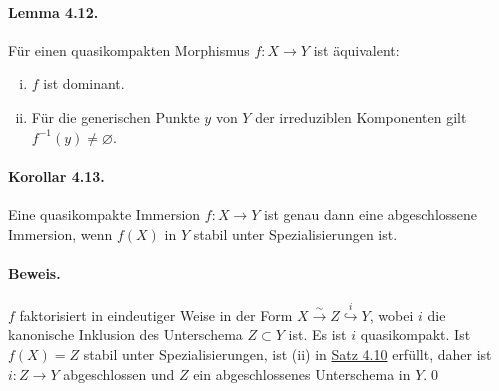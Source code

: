 \paragraph{Lemma 4.12.}\label{4.12} Für einen quasikompakten Morphismus $f:X\to Y$ ist äquivalent:
\begin{enumerate}[(i)]
\item $f$ ist dominant.
\item Für die generischen Punkte $y$ von $Y$ der irreduziblen Komponenten gilt $f^{-1}(y)\neq\varnothing$.
\end{enumerate}

\iffalse
\paragraph{Beweis.} (ii)$\implies$(i) ist trivial. Für die andere Richtung ersetzen wir $f$ durch $f_\text{red}$ und nehmen $X,Y$ als reduziert an. Sei $y\in Y$ ein generischer Punkt einer irreduziblen Komponente von $Y$ und $U\subset_\text{o}Y$ eine affine Umgebung von $y$. $U$ ist insbesondere quasikompakt, also auch $f^{-1}(U)$, d.h. $f^{-1}(U)=\bigcup_iV_i$ hat eine endliche Überdeckung durch offene, affine $V_i$. Da $f$ nach Voraussetzung dominant ist, folgt $U=\overline{ff^{-1}(U)}=\bigcup_i\overline{f(V_i)}$. Daher gibt es ein $i$ mit $y\in\overline{f(V_i)}$. $\overline{f(V_i)}\subset U$ wird mit der reduzierten, abgeschlossenen Unterschemastruktur versehen. Da alle $V_i$ reduziert sind, faktorisiert $f|_{V_i}:V_i\to U$ eindeutig in der Form $V_i\stackrel{g}{\to} \overline{f(V_i)}\hookrightarrow U$.

Somit genügt es zu zeigen, dass $g^{-1}(y)\neq \varnothing$, da $g^{-1}(y)=f^{-1}(y)\cap V_i$. $y$ ist generischer Punkt einer irreduziblen Komponente von $Y$, daher gilt $\mathcal{O}_{U,y}=\mathcal{O}_{Y,y}$.
\fi

\paragraph{Korollar 4.13.}\label{4.13} Eine quasikompakte Immersion $f:X\to Y$ ist genau dann eine abgeschlossene Immersion, wenn $f(X)$ in $Y$ stabil unter Spezialisierungen ist.

\paragraph{Beweis.} $f$ faktorisiert in eindeutiger Weise in der Form $X\stackrel{\sim}{\to}Z\stackrel{i}{\hookrightarrow} Y$, wobei $i$ die kanonische Inklusion des Unterschema $Z\subset Y$ ist. Es ist $i$ quasikompakt. Ist $f(X)=Z$ stabil unter Spezialisierungen, ist (ii) in \hyperref[4.10]{Satz 4.10} erfüllt, daher ist $i:Z\to Y$ abgeschlossen und $Z$ ein abgeschlossenes Unterschema in $Y$.\qed

